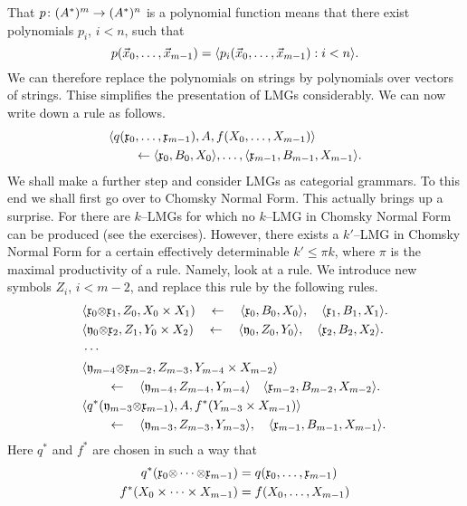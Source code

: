 That $p \colon (A^{\ast})^m \rightarrow (A^{\ast})^n$ is a polynomial function
means that there exist polynomials $p_i$, $i < n$, such that
\begin{equation}
p(\vec{x}_0, \dotsc, \vec{x}_{m-1}) =
\langle p_i(\vec{x}_0, \dotsc, \vec{x}_{m-1}) : i < n\rangle.
\end{equation}
We can therefore replace the polynomials on strings by
polynomials over vectors of strings. Thise simplifies the
presentation of LMGs considerably. We can now write down a
rule as follows.
\begin{align}
& \langle q(\mathfrak{x}_0, \dotsc, \mathfrak{x}_{m-1}), A, f(X_0,\dotsc,X_{m-1})\rangle \\\notag
& \qquad \leftarrow 
\langle \mathfrak{x}_0, B_0, X_0\rangle, \dotsc,
\langle \mathfrak{x}_{m-1}, B_{m-1}, X_{m-1}\rangle.
\end{align}
We shall make a further step and consider LMGs as categorial
grammars. To this end we shall first go over to Chomsky
Normal Form. This actually brings up a surprise. For there are
$k$--LMGs for which no $k$--LMG in Chomsky Normal Form can be
produced (see the exercises). However, there exists a
$k'$--LMG in Chomsky Normal Form for a certain effectively
determinable $k' \leq \pi k$, where $\pi$ is the maximal
productivity of a rule. Namely, look at a rule. We introduce new
symbols $Z_i$, $i < m-2$, and replace this rule by the
following rules.
\begin{equation}
\begin{split}
& \auf \Gx_0 \sotimes \Gx_1, Z_0, X_0 \times X_1) 
    \quad \hrn \quad \auf \Gx_0, B_0, X_0\zu, \quad
    \auf \Gx_1, B_1, X_1\zu. \\
& \auf \Gy_0 \sotimes \Gx_2, Z_1, Y_0 \times X_2) 
    \quad \hrn \quad
    \auf \Gy_0, Z_0, Y_0\zu, \quad
    \auf \Gx_2, B_2, X_2\zu. \\
& \dotsb \\
& \auf \Gy_{m-4} \sotimes \Gx_{m-2}, Z_{m-3}, %
	Y_{m-4} \times X_{m-2}\zu \\
& \qquad \hrn \quad \auf \Gy_{m-4}, Z_{m-4}, Y_{m-4}\zu
    \quad \auf \Gx_{m-2}, B_{m-2}, X_{m-2}\zu. \\
& \auf q^{\ast}(\Gy_{m-3}\sotimes\Gx_{m-1}), A,
    f^{\ast}(Y_{m-3} \times X_{m-1})\zu \\
& \qquad \hrn\quad
    \auf \Gy_{m-3}, Z_{m-3}, Y_{m-3}\zu, \quad
    \auf \Gx_{m-1}, B_{m-1}, X_{m-1}\zu.
\end{split}
\end{equation}
Here $q^{\ast}$ and $f^{\ast}$ are chosen in such a way that
\begin{equation}
\begin{split}
q^{\ast}(\mathfrak{x}_0 \mbox{\small$\otimes$} \dotsm \mbox{\small$\otimes$} \mathfrak{x}_{m-1}) & = 
    q(\mathfrak{x}_0, \dotsc, \mathfrak{x}_{m-1}) \\
f^{\ast}(X_0 \times \dotsb \times X_{m-1}) & = 
    f(X_0, \dotsc, X_{m-1})
\end{split}
\end{equation}
